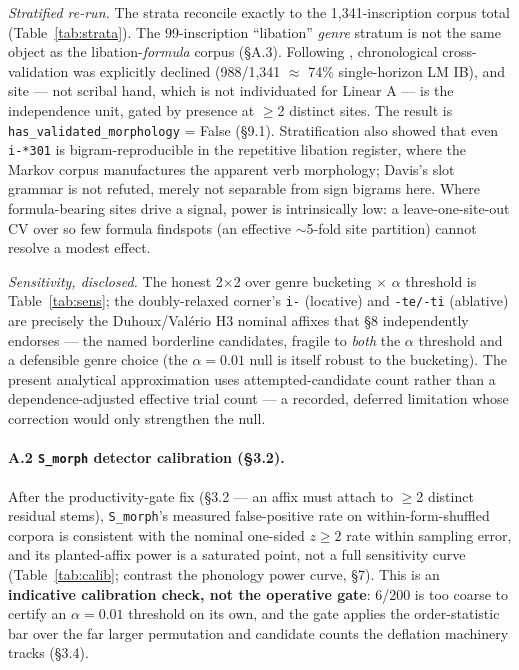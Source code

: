 \emph{Stratified re-run.} The strata reconcile exactly to the
1,341-inscription corpus total (Table~\ref{tab:strata}). The
99-inscription ``libation'' \emph{genre} stratum is not the same object
as the libation-\emph{formula} corpus (\S A.3). Following
\citet{salgarellajudson2024}, chronological cross-validation was explicitly
declined (988/1,341 $\approx$ 74\% single-horizon LM IB), and site --- not
scribal hand, which is not individuated for Linear A
\citep{salgarella2019} --- is the independence unit, gated by presence at
$\ge$2 distinct sites. The result is \texttt{has\_validated\_morphology} =
False (\S9.1). Stratification also showed
that even \texttt{i-*301} is bigram-reproducible in the repetitive libation
register, where the Markov corpus manufactures the apparent verb
morphology; Davis's slot grammar is not refuted, merely not separable from
sign bigrams here. Where formula-bearing sites drive a signal, power is
intrinsically low: a leave-one-site-out CV over so few formula findspots
(an effective $\sim$5-fold site partition) cannot resolve a modest effect.

\emph{Sensitivity, disclosed.} The honest 2$\times$2 over genre bucketing
$\times$ $\alpha$ threshold is Table~\ref{tab:sens}; the doubly-relaxed
corner's \texttt{i-} (locative) and \texttt{-te/-ti} (ablative) are
precisely the Duhoux/Val\'{e}rio H3 nominal affixes that
\citet{salgarella2025} \S8 independently endorses --- the named borderline
candidates, fragile to \emph{both} the $\alpha$ threshold and a defensible
genre choice (the $\alpha = 0.01$ null is itself robust to the bucketing).
The present analytical approximation uses attempted-candidate
count rather than a dependence-adjusted effective trial count --- a
recorded, deferred limitation whose correction would only strengthen the
null.

\paragraph{A.2 \texttt{S\_morph} detector calibration (\S3.2).} After the productivity-gate fix (\S3.2 --- an affix must attach to
$\ge$2 distinct residual stems), \texttt{S\_morph}'s measured false-positive
rate on within-form-shuffled corpora is consistent with the nominal
one-sided $z \ge 2$ rate within sampling error, and its planted-affix
power is a saturated point, not a full sensitivity curve
(Table~\ref{tab:calib}; contrast the phonology power curve, \S7). This is
an \textbf{indicative calibration check, not the operative gate}: 6/200
is too coarse to certify an $\alpha = 0.01$ threshold on its own, and the
gate applies the order-statistic bar over the far larger permutation and
candidate counts the deflation machinery tracks (\S3.4).

